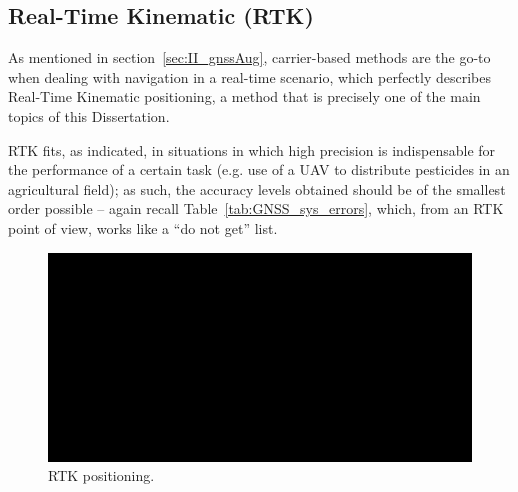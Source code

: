 


\subsection{Real-Time Kinematic (RTK)}\label{sec:II_gnssAug_rtk}

As mentioned in section~\ref{sec:II_gnssAug}, carrier-based methods are the go-to when dealing with navigation in a real-time scenario, which perfectly describes Real-Time Kinematic positioning, a method that is precisely one of the main topics of this Dissertation.

RTK fits, as indicated, in situations in which high precision is indispensable for the performance of a certain task (e.g. use of a UAV to distribute pesticides in an agricultural field); as such, the accuracy levels obtained should be of the smallest order possible -- again recall Table~\ref{tab:GNSS_sys_errors}, which, from an RTK point of view,
works like a ``do not get'' list.

\begin{figure}[ht]
	\centering
	\includegraphics[width=1.0\textwidth]{Chapters/Figures/demo.png}
	\caption{RTK positioning.}
	\label{fig:rtk_workings}
\end{figure}

